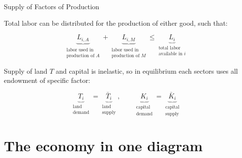 \documentclass[notes,11pt, aspectratio=169, xcolor=table]{beamer}
\newenvironment{wideitemize}{\itemize\addtolength{\itemsep}{10pt}}{\enditemize}
\begin{document}
\begin{frame}{Supply of Factors of Production}
\begin{wideitemize}
        \item Total labor can be distributed for the production of either good, such that:

        \begin{equation*}
            \underbrace{L_{i,A}}_{\substack{\text{labor used in} \\ \text{production of } A}} + \underbrace{L_{i,M}}_{\substack{\text{labor used in} \\ \text{production of } M}} \le \underbrace{L_i}_{\substack{\text{total labor} \\ \text{available in } i}}
        \end{equation*}

        \item Supply of land $T$ and capital is inelastic, so in equilibrium each sectors uses all endowment of specific factor:

        \begin{equation*}
            \underbrace{T_i}_{\substack{\text{land} \\ \text{demand}}} = \underbrace{\bar{T}_i}_{\substack{\text{land} \\ \text{supply}}}, \qquad              \underbrace{K_i}_{\substack{\text{capital} \\ \text{demand}}} = \underbrace{\bar{K}_i}_{\substack{\text{capital} \\ \text{supply}}} 
        \end{equation*}
\end{wideitemize}
\end{frame}

\section{The economy in one diagram}
\end{document}

